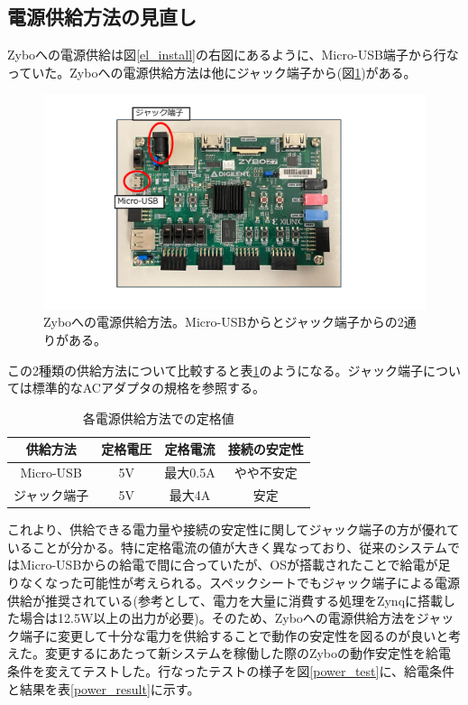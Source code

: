 \subsection{電源供給方法の見直し}
\label{power_sup}
Zyboへの電源供給は図\ref{el_install}の右図にあるように、Micro-USB端子から行なっていた。Zyboへの電源供給方法は他にジャック端子から(図\ref{power_supply})がある。

\begin{figure}[htbp]
  \centering
  \includegraphics[width=0.5\columnwidth]{4_elDAQ/figs/connector_zybo2.pdf}
  \caption{Zyboへの電源供給方法。Micro-USBからとジャック端子からの2通りがある。}
  \label{power_supply}
\end{figure}

この2種類の供給方法について比較すると表\ref{power_spec}のようになる。ジャック端子については標準的なACアダプタの規格を参照する。

\begin{table}[htbp]
  \centering
  \caption{各電源供給方法での定格値}
  \vspace{3mm}
  \begin{tabular}{cccc} \hline
    供給方法 & 定格電圧 & 定格電流 & 接続の安定性  \\ \hline
    Micro-USB & 5V & 最大0.5A & やや不安定\\
    ジャック端子 & 5V & 最大4A &  安定\\ \hline
  \end{tabular}
  \label{power_spec}
\end{table}

これより、供給できる電力量や接続の安定性に関してジャック端子の方が優れていることが分かる。特に定格電流の値が大きく異なっており、従来のシステムではMicro-USBからの給電で間に合っていたが、OSが搭載されたことで給電が足りなくなった可能性が考えられる。スペックシート\cite{power_ref}でもジャック端子による電源供給が推奨されている(参考として、電力を大量に消費する処理をZynqに搭載した場合は12.5W以上の出力が必要)。そのため、Zyboへの電源供給方法をジャック端子に変更して十分な電力を供給することで動作の安定性を図るのが良いと考えた。変更するにあたって新システムを稼働した際のZyboの動作安定性を給電条件を変えてテストした。行なったテストの様子を図\ref{power_test}に、給電条件と結果を表\ref{power_result}に示す。

